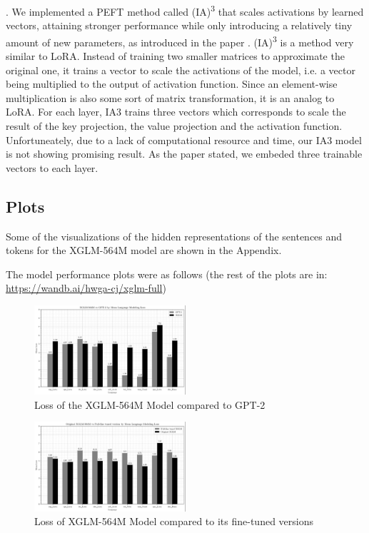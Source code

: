 \documentclass[11pt]{article}
\newcommand{\customsection}[1]{
  \noindent\textbf{#1}.\vspace{2mm}
}
\begin{document}
\customsection{} We implemented a PEFT method called (IA)\textsuperscript{3} that scales activations by learned vectors, attaining stronger performance while only introducing a relatively tiny amount of new parameters, as introduced in the paper \cite{liu2022fewshot}.
(IA)\textsuperscript{3} is a method very similar to LoRA. Instead of training two smaller matrices to approximate the original one,
it trains a vector to scale the activations of the model, i.e. a vector being multiplied to the output of activation function.
Since an element-wise multiplication is also some sort of matrix transformation, it is an analog to LoRA.
For each layer, IA3 trains three vectors which corresponds to scale the result of the key projection, the value projection and the activation function.
Unfortuneately, due to a lack of computational resource and time, our IA3 model is not showing promising result.
As the paper stated, we embeded three trainable vectors to each layer.

\subsection{Plots}

Some of the visualizations of the hidden representations of the sentences and tokens for the XGLM-564M model are shown in the Appendix.

The model performance plots were as follows (the rest of the plots are in: \url{https://wandb.ai/hwga-cj/xglm-full})

\begin{figure}[h]
    \centering
    \includegraphics[width=0.5\textwidth]{plots/xglm_vs_gpt2_mean_losses.png}
    \caption{Loss of the XGLM-564M Model compared to GPT-2}
\end{figure}

\begin{figure}[h]
    \centering
    \includegraphics[width=0.5\textwidth]{plots/xglm_vs_finetuned.png}
    \caption{Loss of XGLM-564M Model compared to its fine-tuned versions}
\end{figure}
\end{document}
